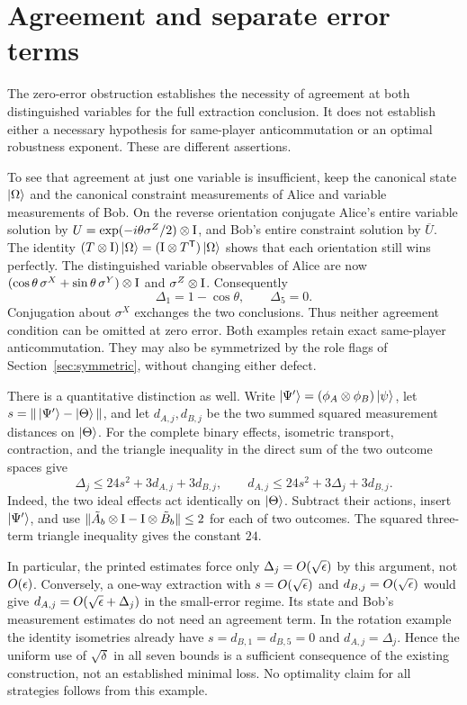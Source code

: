 \documentclass[11pt]{article}
\newcommand{\Id}{\mathrm{I}}
\begin{document}
\section{Agreement and separate error terms}
\label{sec:adoption}

The zero-error obstruction establishes the necessity of agreement at both
distinguished variables for the full extraction conclusion. It does not
establish either a necessary hypothesis for same-player anticommutation or an
optimal robustness exponent. These are different assertions.

To see that agreement at just one variable is insufficient, keep the canonical
state $\ket\Omega$ and the canonical constraint measurements of Alice and
variable measurements of Bob. On the reverse orientation conjugate Alice's
entire variable solution by $U=\exp(-i\theta\sigma^Z/2)\ot\Id$, and Bob's
entire constraint solution by $\overline U$. The identity
$(T\ot\Id)\ket\Omega=(\Id\ot T^{\mathsf T})\ket\Omega$ shows that each
orientation still wins perfectly. The distinguished variable observables of
Alice are now $(\cos\theta\,\sigma^X+\sin\theta\,\sigma^Y)\ot\Id$ and
$\sigma^Z\ot\Id$. Consequently
\[
  \Delta_1=1-\cos\theta,\qquad \Delta_5=0.
\]
Conjugation about $\sigma^X$ exchanges the two conclusions. Thus neither
agreement condition can be omitted at zero error. Both examples retain exact
same-player anticommutation. They may also be symmetrized by the role flags
of Section~\ref{sec:symmetric}, without changing either defect.

There is a quantitative distinction as well. Write
$\ket{\Psi'}=(\phi_A\otimes\phi_B)\ket\psi$, let
$s=\|\ket{\Psi'}-\ket\Theta\|$, and let $d_{A,j},d_{B,j}$ be the two
summed squared measurement distances on $\ket\Theta$. For the complete
binary effects, isometric transport, contraction, and the triangle inequality
in the direct sum of the two outcome spaces give
\begin{equation}
  \Delta_j \le 24s^2+3d_{A,j}+3d_{B,j},\qquad
  d_{A,j}\le 24s^2+3\Delta_j+3d_{B,j}.
  \label{eq:agreement-transfer}
\end{equation}
Indeed, the two ideal effects act identically on $\ket\Theta$. Subtract their
actions, insert $\ket{\Psi'}$, and use
$\|\tilde A_b\ot\Id-\Id\ot\tilde B_b\|\le2$ for each of two outcomes.
The squared three-term triangle inequality gives the constant $24$.

In particular, the printed estimates force only
$\Delta_j=O(\sqrt{\epsilon})$ by this argument, not $O(\epsilon)$.
Conversely, a one-way extraction with $s=O(\sqrt{\epsilon})$ and
$d_{B,j}=O(\sqrt{\epsilon})$ would give
$d_{A,j}=O(\sqrt{\epsilon}+\Delta_j)$ in the small-error regime. Its state and
Bob's measurement estimates do not need an agreement term. In the rotation
example the identity isometries already have $s=d_{B,1}=d_{B,5}=0$ and
$d_{A,j}=\Delta_j$. Hence the uniform use of $\sqrt\delta$ in all seven
bounds is a sufficient consequence of the existing construction, not an
established minimal loss. No optimality claim for all strategies follows from
this example.
\end{document}
